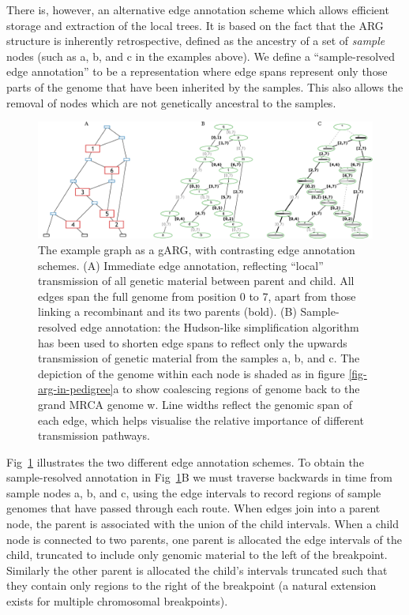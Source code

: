 \documentclass{article}
\begin{document}
There is, however, an alternative edge annotation scheme which allows efficient
storage and extraction of the local trees. It is based on the fact that the ARG
structure is inherently retrospective, defined as the ancestry of a set of \emph{sample}
nodes (such as \textsf{a}, \textsf{b}, and \textsf{c} in the examples above). We define a
``sample-resolved edge annotation'' to be a representation where edge spans
represent only those parts of the genome that have been inherited by the samples.
This also allows the removal of nodes which are not genetically ancestral to the samples.

\begin{figure}
\centering
\includegraphics[width=\textwidth]{illustrations/ancestry-resolution}
\caption{\label{fig-ancestry-resolution}
The \citet[][fig.~1]{wiuf1999recombination} example graph as a gARG, with contrasting
edge annotation schemes.
(A) Immediate edge annotation, reflecting ``local'' transmission of all
genetic material between parent and child. All edges span the full genome from position 0 to 7,
apart from those linking a recombinant and its two parents (bold).
(B) Sample-resolved edge annotation: the Hudson-like simplification algorithm has been used to
shorten edge spans to reflect only the upwards transmission of genetic
material from the samples \textsf{a}, \textsf{b}, and \textsf{c}. The depiction of the genome within
each node is shaded as in figure \ref{fig-arg-in-pedigree}a to show
coalescing regions of genome back to the grand MRCA genome \textsf{w}.
Line widths reflect the genomic span of each edge, which
helps visualise the relative importance of different transmission pathways.
}
\end{figure}

Fig~\ref{fig-ancestry-resolution} illustrates the two different edge annotation
schemes. To obtain the sample-resolved annotation in
Fig~\ref{fig-ancestry-resolution}B we must traverse backwards in time from
sample nodes \textsf{a}, \textsf{b}, and \textsf{c}, using the edge intervals
to record regions of sample genomes that have passed through each route. When
edges join into a parent node, the parent is associated with the union of the
child intervals. When a child node is connected to two parents, one parent is
allocated the edge intervals of the child, truncated to include only genomic
material to the left of the breakpoint. Similarly the other parent is allocated
the child's intervals truncated such that they contain only regions to the
right of the breakpoint (a natural extension exists for multiple chromosomal
breakpoints).
\end{document}
